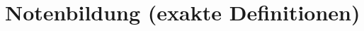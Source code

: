 \vspace*{-0.8cm}
\section{Notenbildung (exakte Definitionen)}



\newcommand{\defformat}[1]{\tikz[baseline=(char.base)]{\node[draw,rectangle,inner sep=2pt] (char) {\textit{#1}};}}

\newcommand{\defka}{\defformat{KA}}
\newcommand{\defgfs}{\defformat{GFS}}
\newcommand{\defkt}{\defformat{KT}}
\newcommand{\defktp}{\defformat{P}}
\newcommand{\defsl}{\defformat{S}}
\newcommand{\defv}{\defformat{V}}
\newcommand{\defm}{\defformat{M}}
\newcommand{\defe}{\defformat{E}}
\newcommand{\defsn}{\defformat{N}}
\newcommand{\defsnp}{\defformat{NP}}

\newcommand{\catka}{\defka~und~\defgfs}
\newcommand{\catkt}{\defkt~und~\defsl~und~\defktp}
\newcommand{\catm}{\defm~und~\defe}

